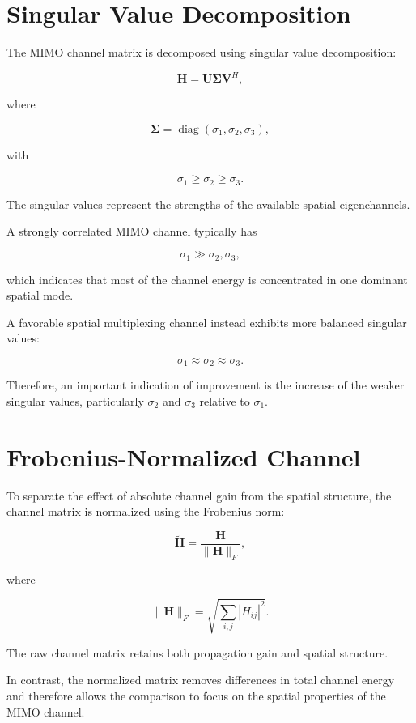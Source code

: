 \documentclass[11pt,a4paper]{article}
\begin{document}
\section{Singular Value Decomposition}

The MIMO channel matrix is decomposed using singular value decomposition:

\[
\mathbf{H}
=
\mathbf{U}
\mathbf{\Sigma}
\mathbf{V}^{H},
\]

where

\[
\mathbf{\Sigma}
=
\operatorname{diag}
\left(
\sigma_1,
\sigma_2,
\sigma_3
\right),
\]

with

\[
\sigma_1
\geq
\sigma_2
\geq
\sigma_3.
\]

The singular values represent the strengths of the available spatial eigenchannels.

A strongly correlated MIMO channel typically has

\[
\sigma_1
\gg
\sigma_2,\sigma_3,
\]

which indicates that most of the channel energy is concentrated in one dominant spatial mode.

A favorable spatial multiplexing channel instead exhibits more balanced singular values:

\[
\sigma_1
\approx
\sigma_2
\approx
\sigma_3.
\]

Therefore, an important indication of improvement is the increase of the weaker singular values, particularly $\sigma_2$ and $\sigma_3$ relative to $\sigma_1$.

\section{Frobenius-Normalized Channel}

To separate the effect of absolute channel gain from the spatial structure, the channel matrix is normalized using the Frobenius norm:

\[
\widetilde{\mathbf{H}}
=
\frac{\mathbf{H}}
{\|\mathbf{H}\|_F},
\]

where

\[
\|\mathbf{H}\|_F
=
\sqrt{
\sum_{i,j}|H_{ij}|^2
}.
\]

The raw channel matrix retains both propagation gain and spatial structure.

In contrast, the normalized matrix removes differences in total channel energy and therefore allows the comparison to focus on the spatial properties of the MIMO channel.
\end{document}
